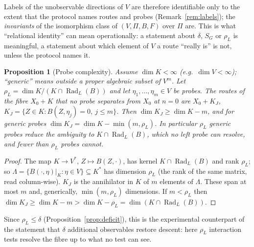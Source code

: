 \documentclass[11pt,a4paper]{article}
\newcommand{\Rad}{\operatorname{Rad}}
\newcommand{\defic}{\delta}
\theoremstyle{plain}
\newtheorem{proposition}[theorem]{Proposition}
\theoremstyle{definition}
\begin{document}
Labels of the unobservable directions of $V$ are therefore identifiable only to the extent that the protocol names routes and probes (Remark~\ref{rem:labels}); the \emph{invariants} of the isomorphism class of $(V,\Pi,B,F)$ over $\Pi$ are. This is what ``relational identity'' can mean operationally: a statement about $\defic$, $S_G$ or $\rho_L$ is meaningful, a statement about which element of $V$ a route ``really is'' is not, unless the protocol names it.

\begin{proposition}[Probe complexity]\label{prop:probe}
Assume $\dim K<\infty$ (e.g.\ $\dim V<\infty$); ``generic'' means outside a proper algebraic subset of $V^m$. Let $\rho_L=\dim K/(K\cap\Rad_L(B))$ and let $\eta_1,\dots,\eta_m\in V$ be probes. The routes of the fibre $X_0+K$ that no probe separates from $X_0$ at $n=0$ are $X_0+K_J$, $K_J=\{Z\in K:B(Z,\eta_j)=0,\ j\le m\}$. Then $\dim K_J\ge\dim K-m$, and for generic probes $\dim K_J=\dim K-\min(m,\rho_L)$. In particular $\rho_L$ generic probes reduce the ambiguity to $K\cap\Rad_L(B)$, which no left probe can resolve, and fewer than $\rho_L$ probes cannot.
\end{proposition}
\begin{proof}
The map $K\to V^{*}$, $Z\mapsto B(Z,\cdot)$, has kernel $K\cap\Rad_L(B)$ and rank $\rho_L$; so $\Lambda=\{B(\cdot,\eta)|_K:\eta\in V\}\subseteq K^{*}$ has dimension $\rho_L$ (the rank of the same matrix, read column-wise).
$K_J$ is the annihilator in $K$ of $m$ elements of $\Lambda$. These span at most $m$ and, generically, $\min(m,\rho_L)$ dimensions. If $m<\rho_L$ then $\dim K_J\ge\dim K-m>\dim K-\rho_L=\dim(K\cap\Rad_L(B))$.
\end{proof}
Since $\rho_L\le\defic$ (Proposition~\ref{prop:deficit}), this is the experimental counterpart of the statement that $\defic$ additional observables restore descent: here $\rho_L$ interaction tests resolve the fibre up to what no test can see.
\end{document}
